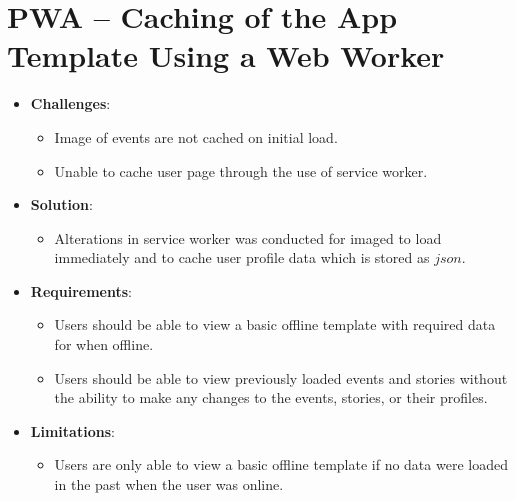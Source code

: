 \documentclass[11pt, a4paper]{article}
\begin{document}
\section{PWA – Caching of the App Template Using a Web Worker}
\begin{itemize}
  \item \textbf{Challenges}: 
  \begin{itemize}
    \item Image of events are not cached on initial load.
    \item Unable to cache user page through the use of service worker.
  \end{itemize}
  \item \textbf{Solution}:
  \begin{itemize}
    \item Alterations in service worker was conducted for imaged to load immediately and to cache 
    user profile data which is stored as $json$.
  \end{itemize}
  \item \textbf{Requirements}: 
  \begin{itemize}
    \item Users should be able to view a basic offline template with required data for when offline.
    \item Users should be able to view previously loaded events and stories without the ability to make 
    any changes to the events, stories, or their profiles.
  \end{itemize}
  \item \textbf{Limitations}: 
  \begin{itemize}
    \item Users are only able to view a basic offline template if no data were loaded in the past when 
    the user was online.
  \end{itemize}
\end{itemize}
\end{document}
